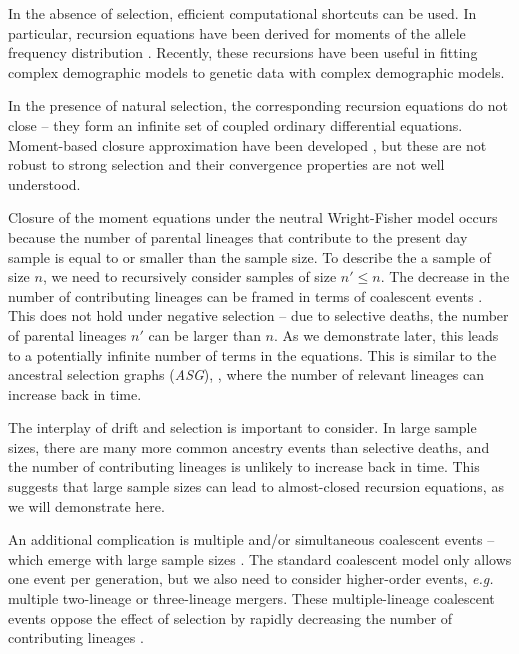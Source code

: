 \documentclass[review]{elsarticle}
\begin{document}
In the absence of selection, efficient computational shortcuts can be used. In particular, recursion
equations have been derived for moments of the allele frequency distribution
\citep{KimuraCrow1964,Ewens1972,JouganousEtAl2017}. Recently, these recursions have been useful in
fitting complex demographic models to genetic data \citep{JouganousEtAl2017,KammEtAl2017} with
complex demographic models.
 
In the presence of natural selection, the corresponding recursion equations do not close
\citep{Donnelly, JouganousEtAl2017} -- they form an infinite set of coupled ordinary differential
equations. Moment-based closure approximation have been developed \citep{JouganousEtAl2017}, but
these are not robust to strong selection and their convergence properties are not well understood.

Closure of the moment equations under the neutral Wright-Fisher model occurs because the number of
parental lineages that contribute to the present day sample is equal to or smaller than the sample
size. To describe the a sample of size $n$, we need to recursively consider samples of size
$n'\le n$. The decrease in the number of contributing lineages can be framed in terms of coalescent
events \citep{Kingman1982a}. This does not hold under negative selection -- due to selective deaths,
the number of parental lineages $n'$ can be larger than $n$. As we demonstrate later, this leads to
a potentially infinite number of terms in the equations. This is similar to the ancestral selection
graphs (\textit{ASG}), \citep{KroneNeuhauser1997}, where the number of relevant lineages can
increase back in time.

The interplay of drift and selection is important to consider. In large sample sizes, there are many
more common ancestry events than selective deaths, and the number of contributing lineages is
unlikely to increase back in time. This suggests that large sample sizes can lead to
almost-closed recursion equations, as we will demonstrate here.

An additional complication is multiple and/or simultaneous coalescent events -- which emerge with
large sample sizes \citep{BhaskarEtAl2014}. The standard coalescent model only allows one event per
generation, but we also need to consider higher-order events, \textit{e.g.} multiple two-lineage or
three-lineage mergers. These multiple-lineage coalescent events oppose the effect of selection by
rapidly decreasing the number of contributing lineages \citep{NelsonEtAl2019}.
\end{document}
